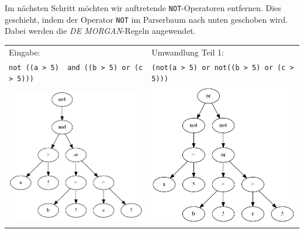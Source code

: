 Im nächsten Schritt möchten wir auftretende \verb|NOT|-Operatoren entfernen. Dies geschieht, indem der Operator \verb|NOT| im Parserbaum nach unten geschoben wird. Dabei werden die \textit{DE MORGAN}-Regeln angewendet. 

\begin{tabular}{ll}
Eingabe: & Umwandlung Teil 1:\\
\verb|not ((a > 5)  and ((b > 5) or (c > 5)))| & \verb|(not(a > 5) or not((b > 5) or (c > 5)))|\\
\includegraphics[scale=0.5]{Bilder/not_graph1.png} & \includegraphics[scale=0.5]{Bilder/not_graph2.png}\\
\end{tabular}

